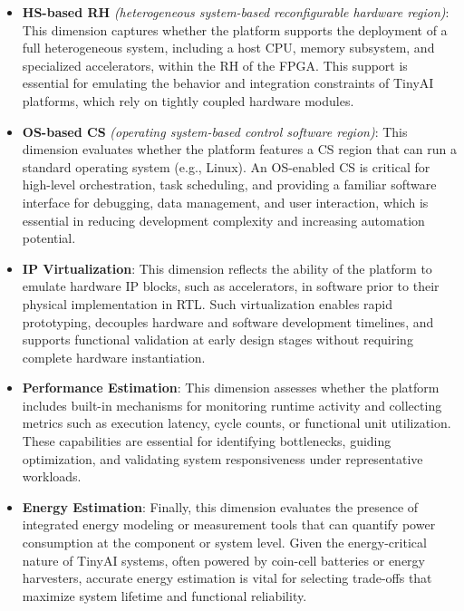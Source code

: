         \vspace{-1em}
        \begin{itemize}
            \item \textbf{HS-based RH} \emph{(heterogeneous system-based reconfigurable hardware region)}: This dimension captures whether the platform supports the deployment of a full heterogeneous system, including a host CPU, memory subsystem, and specialized accelerators, within the RH of the FPGA. This support is essential for emulating the behavior and integration constraints of TinyAI platforms, which rely on tightly coupled hardware modules.
            
            \item \textbf{OS-based CS} \emph{(operating system-based control software region)}: This dimension evaluates whether the platform features a CS region that can run a standard operating system (e.g., Linux). An OS-enabled CS is critical for high-level orchestration, task scheduling, and providing a familiar software interface for debugging, data management, and user interaction, which is essential in reducing development complexity and increasing automation potential.
            
            \item \textbf{IP Virtualization}: This dimension reflects the ability of the platform to emulate hardware IP blocks, such as accelerators, in software prior to their physical implementation in RTL. Such virtualization enables rapid prototyping, decouples hardware and software development timelines, and supports functional validation at early design stages without requiring complete hardware instantiation.
            
            \item \textbf{Performance Estimation}: This dimension assesses whether the platform includes built-in mechanisms for monitoring runtime activity and collecting metrics such as execution latency, cycle counts, or functional unit utilization. These capabilities are essential for identifying bottlenecks, guiding optimization, and validating system responsiveness under representative workloads.
            
            \item \textbf{Energy Estimation}: Finally, this dimension evaluates the presence of integrated energy modeling or measurement tools that can quantify power consumption at the component or system level. Given the energy-critical nature of TinyAI systems, often powered by coin-cell batteries or energy harvesters, accurate energy estimation is vital for selecting trade-offs that maximize system lifetime and functional reliability.
        \end{itemize}
        \vspace{-1em}
        

